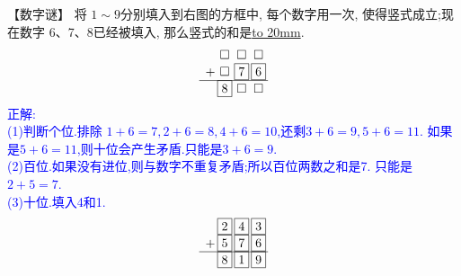 \item {
    【数字谜】
    将 $1\sim 9$分别填入到右图的方框中, 每个数字用一次, 使得竖式成立;现在数字 6、7、8已经被填入, 那么竖式的和是\underline{\hbox to 20mm{}}.
    \[
    \begin{array}{l@{\,} c@{\,} c@{\,} c@{\,}}
    & \square & \square & \square \\
    + & \square  & \boxed{7} & \boxed{6} \\
    \cline{1-4}
    & \boxed{8} & \square & \square \\
    \end{array}
    \]
    \ifshowSolution 
        \fangsong{}\textcolor{blue}{
            正解: \\
            (1)判断个位.排除 $1+6=7,2+6=8,4+6=10$,还剩$3+6=9,5+6=11$. 如果是$5+6=11$,则十位会产生矛盾.只能是$3+6=9$. \\
            (2)百位.如果没有进位,则与数字不重复矛盾;所以百位两数之和是7. 只能是$2+5=7$.\\
            (3)十位.填入4和1.\\
            \[
            \begin{array}{l@{\,} c@{\,} c@{\,} c@{\,}}
            & \boxed{2} & \boxed{4} & \boxed{3} \\
            + & \boxed{5}  & \boxed{7} & \boxed{6} \\
            \cline{1-4}
            & \boxed{8} & \boxed{1} & \boxed{9} \\
            \end{array}
            \]
        }
    \else
        \vspace{1cm}
    \fi
}

